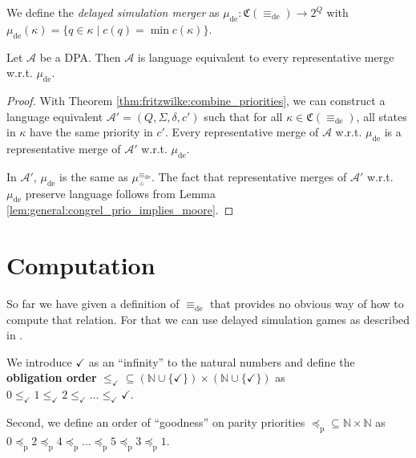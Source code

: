 \begin{defn}
	We define the \emph{delayed simulation merger} as $\mu_\text{de} : \mathfrak{C}(\equiv_\text{de}) \rightarrow 2^Q$ with $\mu_\text{de}(\kappa) = \{ q \in \kappa \mid c(q) = \min c(\kappa) \}$.
\end{defn}

\begin{cor}
	Let $\mathcal{A}$ be a DPA. Then $\mathcal{A}$ is language equivalent to every representative merge w.r.t. $\mu_\text{de}$.
\end{cor}

\begin{proof}
	With Theorem \ref{thm:fritzwilke:combine_priorities}, we can construct a language equivalent $\mathcal{A}' = (Q, \Sigma, \delta, c')$ such that for all $\kappa \in \mathfrak{C}(\equiv_\text{de})$, all states in $\kappa$ have the same priority in $c'$. Every representative merge of $\mathcal{A}$ w.r.t. $\mu_\text{de}$ is a representative merge of $\mathcal{A}'$ w.r.t. $\mu_\text{de}$.
	
	In $\mathcal{A}'$, $\mu_\text{de}$ is the same as $\mu^{\equiv_\text{de}}_\div$. The fact that representative merges of $\mathcal{A}'$ w.r.t. $\mu_\text{de}$ preserve language follows from Lemma \ref{lem:general:congrel_prio_implies_moore}.
\end{proof}



\section{Computation}
So far we have given a definition of $\equiv_\text{de}$ that provides no obvious way of how to compute that relation. For that we can use delayed simulation games as described in \cite{FritzWilke06}.

\begin{defn}
	We introduce $\checkmark$ as an \enquote{infinity} to the natural numbers and define the \textbf{obligation order} $\leq_\checkmark \subseteq (\mathbb{N} \cup \{\checkmark\}) \times (\mathbb{N} \cup \{\checkmark\})$ as $0 \leq_\checkmark 1 \leq_\checkmark 2 \leq_\checkmark \dots \leq_\checkmark \checkmark$.
	
	Second, we define an order of \enquote{goodness} on parity priorities $\preceq_\text{p} \subseteq \mathbb{N} \times \mathbb{N}$ as $0 \preceq_\text{p} 2 \preceq_\text{p} 4 \preceq_\text{p} \dots \preceq_\text{p} 5 \preceq_\text{p} 3 \preceq_\text{p} 1$.
\end{defn}

